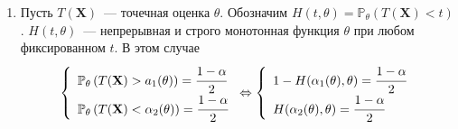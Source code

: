 \documentclass[oneside,final,14pt]{extreport}
\theoremstyle{plain}
\theoremstyle{definition}
\theoremstyle{named}
\begin{document}
\begin{enumerate}
    \item Пусть $T(\mathbf{X})$~--- точечная оценка $\theta$. Обозначим $H(t, \theta)=\mathbb{P}_{\theta}(T(\mathbf{X})<t)$. $H(t,\theta)$~--- непрерывная и строго монотонная функция $\theta$ при любом фиксированном $t$. В этом случае
    \begin{equation*}
        \left\{\begin{array}{l}
            \mathbb{P}_{\theta}\left(T(\mathbf{X})>a_{1}(\theta)\right)
            = \cfrac{1-\alpha}{2} \\ 
            \mathbb{P}_{\theta}\left(T(\mathbf{X})<\alpha_{2}(\theta)\right)
            = \cfrac{1-\alpha}{2}
        \end{array}\right. 
        \Leftrightarrow 
        \left\{\begin{array}{l}
            1 - H(\alpha_{1}(\theta), \theta)=\cfrac{1-\alpha}{2} \\ 
            H(\alpha_{2}(\theta), \theta)=\cfrac{1-\alpha}{2}
        \end{array}\right.
    \end{equation*}
    

\end{enumerate}
\end{document}

